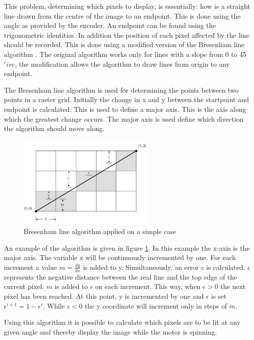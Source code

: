 This problem, determining which pixels to display, is essentially: how is a straight line drawn from the centre of the image to an endpoint.
This is done using the angle as provided by the encoder.
An endpoint can be found using the trigonometric identities.
In addition the position of each pixel affected by the line should be recorded.
This is done using a modified version of the Bresenham line algorithm \cite{bresenham}.
The original algorithm works only for lines with a slope from 0 to 45$^circ$, the modification allows the algorithm to draw lines from origin to any endpoint.

The Bresenham line algorithm is used for determining the points between two points in a raster grid.
Initially the change in x and y between the startpoint and endpoint is calculated.
This is used to define a major axis.
This is the axis along which the greatest change occurs.
The major axis is used define which direction the algorithm should move along. 

\begin{figure}[H]
\center
\includegraphics[width = 0.6\textwidth]{images/bresenham}
\caption{Bresenham line algorithm applied on a simple case}
\label{fig:bresenham_line}
\end{figure}

An example of the algorithm is given in figure \ref{fig:bresenham_line}.
In this example the x-axis is the major axis.
The variable x will be continuously incremented by one.
For each increment a value $m = \frac{dy}{dx}$ is added to y.
Simultaneously, an error $\epsilon$ is calculated.
$\epsilon$ represents the negative distance between the real line and the top edge of the current pixel.
$m$ is added to $\epsilon$ on each increment.
This way, when $\epsilon>0$ the next pixel has been reached.
At this point, y is incremented by one and $\epsilon$ is set $\epsilon^{i+1}=1-\epsilon^i$.
While $\epsilon<0$ the y coordinate will increment only in steps of $m$.

Using this algorithm it is possible to calculate which pixels are to be lit at any given angle and thereby display the image while the motor is spinning.